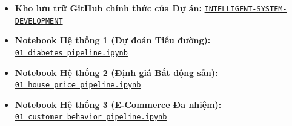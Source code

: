 \documentclass[12pt,a4paper]{report}
\begin{document}
\begin{tcolorbox}[colback=blue!3!white, colframe=blue!75!black, title=\textbf{Kho lưu trữ Mã nguồn \& Jupyter Notebook Thực nghiệm Dự án}]
\small
\begin{itemize}[leftmargin=1.5em, itemsep=2pt]
    \item \textbf{Kho lưu trữ GitHub chính thức của Dự án:} \href{https://github.com/phamtu2x5/INTELLIGENT-SYSTEM-DEVELOPMENT}{\texttt{INTELLIGENT-SYSTEM-DEVELOPMENT}}
    \item \textbf{Notebook Hệ thống 1 (Dự đoán Tiểu đường):} \href{https://github.com/phamtu2x5/INTELLIGENT-SYSTEM-DEVELOPMENT/blob/main/src/Assigment%2002/diabetes/notebook/01_diabetes_pipeline.ipynb}{\texttt{01\_diabetes\_pipeline.ipynb}}
    \item \textbf{Notebook Hệ thống 2 (Định giá Bất động sản):} \href{https://github.com/phamtu2x5/INTELLIGENT-SYSTEM-DEVELOPMENT/blob/main/src/Assigment%2002/house_price/notebook/01_house_price_pipeline.ipynb}{\texttt{01\_house\_price\_pipeline.ipynb}}
    \item \textbf{Notebook Hệ thống 3 (E-Commerce Đa nhiệm):} \href{https://github.com/phamtu2x5/INTELLIGENT-SYSTEM-DEVELOPMENT/blob/main/src/Assigment%2002/customer_behavior/notebook/01_customer_behavior_pipeline.ipynb}{\texttt{01\_customer\_behavior\_pipeline.ipynb}}
\end{itemize}
\end{tcolorbox}
\end{document}
